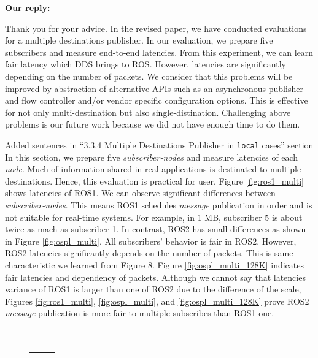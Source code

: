 \documentclass{article}
\begin{document}
\begin{enumerate}
  \begin{flushleft}
    \textbf{Our reply:}
  \end{flushleft}
  Thank you for your advice.
  In the revised paper, we have conducted evaluations for a multiple destinations publisher.
  In our evaluation, we prepare five subscribers and measure end-to-end latencies.
  From this experiment, we can learn fair latency which DDS brings to ROS.
  However, latencies are significantly depending on the number of packets.
  We consider that this problems will be improved by abstraction of alternative APIs such as an asynchronous publisher and flow controller and/or vendor specific configuration options.
  This is effective for not only multi-destination but also single-distination.
  Challenging above problems is our future work because we did not have enough time to do them.
  \begin{itembox}[|]{Added sentences in ``3.3.4 Multiple Destinations Publisher in \texttt{local} cases'' section}
    In this section, we prepare five \emph{subscriber-nodes} and measure latencies of each \emph{node}.
    Much of information shared in real applications is destinated to multiple destinations.
    Hence, this evaluation is practical for user.
    Figure \ref{fig:ros1_multi} shows latencies of ROS1.
    We can observe significant differences between \emph{subscriber-nodes}.
    This means ROS1 schedules \emph{message} publication in order and is not suitable for real-time systems.
    For example, in 1 MB, subscriber 5 is about twice as mach as subscriber 1.
    In contrast, ROS2 has small differences as shown in Figure \ref{fig:ospl_multi}.
    All subscribers' behavior is fair in ROS2.
    However, ROS2 latencies significantly depends on the number of packets.
    This is same characteristic we learned from Figure 8.
    Figure \ref{fig:ospl_multi_128K} indicates fair latencies and dependency of packets.
    Although we cannot say that latencies variance of ROS1 is larger than one of ROS2 due to the difference of the scale, Figures \ref{fig:ros1_multi}, \ref{fig:ospl_multi}, and \ref{fig:ospl_multi_128K} prove ROS2 \emph{message} publication is more fair to multiple subscribes than ROS1 one.
  \end{itembox}\\
  \setcounter{figure}{16}
  \begin{figure}[h]
    \begin{tabular}{ccc}
      \begin{minipage}[t]{0.31\textwidth}

\end{minipage}
\end{tabular}
\end{figure}
\end{enumerate}
\end{document}
